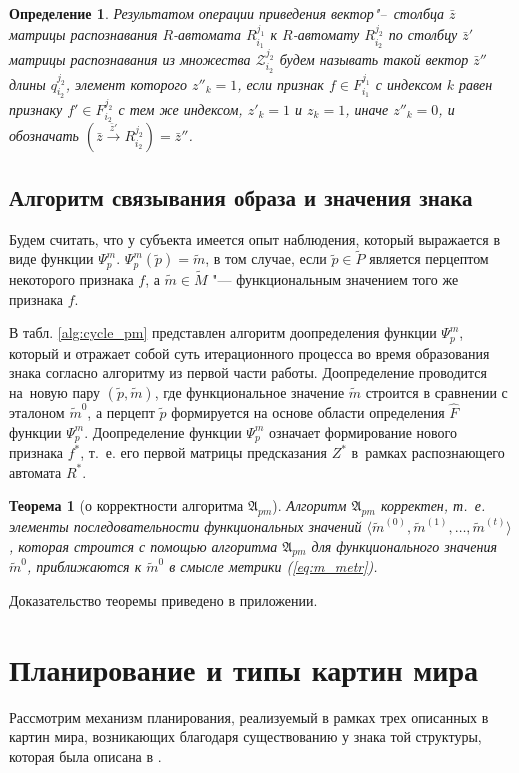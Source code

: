 \documentclass[a4paper, 12pt]{article}
\theoremstyle{break}
\newtheorem{Theorem}{Теорема}
\newtheorem{Def}{Определение}
\numberwithin{equation}{section}
\begin{document}
	\begin{Def}
		Результатом операции приведения вектор"--~столбца $\bar z$ матрицы распознавания $R$-автомата $R_{i_1}^{j_1}$ к $R$-автомату $R_{i_2}^{j_2}$ по столбцу $\bar z'$ матрицы распознавания из множества  $\mathcal Z_{i_2}^{j_2}$ будем называть такой вектор $\bar z''$ длины $q_{i_2}^{j_2}$, элемент которого $z''_k=1$, если признак $f\in F_{i_1}^{j_1}$ с индексом $k$ равен признаку $f'\in F_{i_2}^{j_2}$ с тем же индексом, $z'_k=1$ и $z_k=1$, иначе $z''_k=0$, и обозначать $(\bar z\xrightarrow{\bar z'} R_{i_2}^{j_2})=\bar z''$.
	\end{Def}

	
	\subsection{Алгоритм связывания образа и значения знака}
	Будем считать, что у субъекта имеется опыт наблюдения, который выражается в виде функции $\Psi_p^m$. $\Psi_p^m(\tilde p)=\tilde m$, в том случае, если $\tilde p\in\tilde P$ является перцептом некоторого признака $f$, а $\tilde m\in\tilde M$ "--- функциональным значением того же признака $f$.
	
	В табл. \ref{alg:cycle_pm} представлен алгоритм доопределения функции $\Psi_p^m$, который и отражает собой суть итерационного процесса во время образования знака согласно алгоритму из первой части работы. Доопределение проводится на~новую пару $(\tilde p,\tilde m)$, где функциональное значение $\tilde m$ строится в сравнении с эталоном $\tilde m^0$, а перцепт $\tilde p$ формируется на основе области определения $\hat F$ функции $\Psi_p^m$. Доопределение функции $\Psi_p^m$ означает формирование нового признака $f^*$, т.~е. его первой матрицы предсказания $Z^*$ в~рамках распознающего автомата $R^*$.
			
	\begin{Theorem}[о корректности алгоритма $\mathfrak A_{pm}$]\label{th:pm_correct}
		Алгоритм $\mathfrak A_{pm}$ корректен, т.~е. элементы последовательности функциональных значений $\langle\tilde m^{(0)},\tilde m^{(1)},\dots,\tilde m^{(t)}\rangle$, которая строится с помощью алгоритма $\mathfrak A_{pm}$ для функционального значения $\tilde m^0$, приближаются к $\tilde m^0$ в смысле метрики (\ref{eq:m_metr}).
	\end{Theorem}
	
	Доказательство теоремы приведено в приложении.
	
	\section{Планирование и типы картин мира} \label{sect:plan_wm}
	Рассмотрим механизм планирования, реализуемый в рамках трех описанных в \cite{Chudova2012a} картин мира, возникающих благодаря существованию у знака той структуры, которая была описана в \cite{PanovA2014a}.
	
\end{document}
